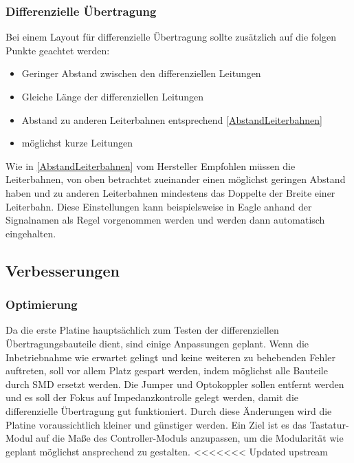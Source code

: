 \subsubsection{Differenzielle Übertragung}
Bei einem Layout für differenzielle Übertragung sollte zusätzlich auf die folgen Punkte geachtet werden:


\begin{itemize}
	\item Geringer Abstand zwischen den differenziellen Leitungen
	\item Gleiche Länge der differenziellen Leitungen
	\item Abstand zu anderen Leiterbahnen entsprechend \ref{AbstandLeiterbahnen}
	\item möglichst kurze Leitungen 
\end{itemize}


Wie in \ref{AbstandLeiterbahnen} vom Hersteller Empfohlen müssen die Leiterbahnen, von oben betrachtet zueinander einen möglichst geringen Abstand haben und zu anderen Leiterbahnen mindestens das Doppelte der Breite einer Leiterbahn. Diese Einstellungen kann beispielsweise in Eagle anhand der Signalnamen als Regel vorgenommen werden und werden dann automatisch eingehalten.

\subsection{Verbesserungen}
\subsubsection{Optimierung}

Da die erste Platine hauptsächlich zum Testen der differenziellen Übertragungsbauteile dient, sind einige Anpassungen geplant. \newline
Wenn die Inbetriebnahme wie erwartet gelingt und keine weiteren zu behebenden Fehler auftreten, soll vor allem Platz gespart werden, indem möglichst alle Bauteile durch SMD ersetzt werden. Die Jumper und Optokoppler sollen entfernt werden und es soll der Fokus auf Impedanzkontrolle gelegt werden, damit die differenzielle Übertragung gut funktioniert. \newline
Durch diese Änderungen wird die Platine voraussichtlich kleiner und günstiger werden. Ein Ziel ist es das Tastatur-Modul auf die Maße des Controller-Moduls anzupassen, um die Modularität wie geplant möglichst ansprechend zu gestalten. \newline
<<<<<<< Updated upstream

